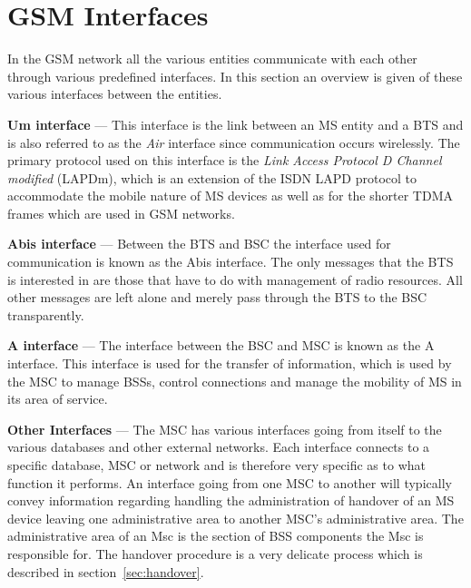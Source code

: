 \section{GSM Interfaces}
\label{sec:gsminterfaces}
In the GSM network all the various entities communicate with each other through various predefined interfaces. In this section an overview is given of these various interfaces between the entities.
\begin{description}
\item{\textbf{Um interface}} --- This interface is the link between an MS entity and a BTS and is also referred to as the \emph{Air} interface since communication occurs wirelessly. The primary protocol used on this interface is the \emph{Link Access Protocol D Channel modified} (LAPDm), which is an extension of the ISDN LAPD protocol to accommodate the mobile nature of MS devices as well as for the shorter TDMA frames which are used in GSM networks\cite{wirelesstelcoMullet,GSMSecurInTeleNetwork}.
\item{\textbf{Abis interface}} --- Between the BTS and BSC the interface used for communication is known as the Abis interface. The only messages that the BTS is interested in are those that have to do with management of radio resources\cite{wirelesstelcoMullet,GSMSecurInTeleNetwork}. All other messages are left alone and merely pass through the BTS to the BSC transparently.
\item{\textbf{A interface}} --- The interface between the BSC and MSC is known as the A interface. This interface is used for the transfer of information, which is used by the MSC to manage BSSs, control connections and manage the mobility of MS in its area of service\cite{wirelesstelcoMullet,GSMArchitectureProtocolsServices}.
\item{\textbf{Other Interfaces}} --- The MSC has various interfaces going from itself to the various databases and other external networks. Each interface connects to a specific database, MSC or network and is therefore very specific as to what function it performs\cite{wirelesstelcoMullet,GSMArchitectureProtocolsServices}. An interface going from one MSC to another will typically convey information regarding handling the administration of handover of an MS device leaving one administrative area to another MSC's administrative area. The administrative area of an Msc is the section of BSS components the Msc is responsible for. The handover procedure is a very delicate process which is described in section~\ref{sec:handover}.
\end{description}

